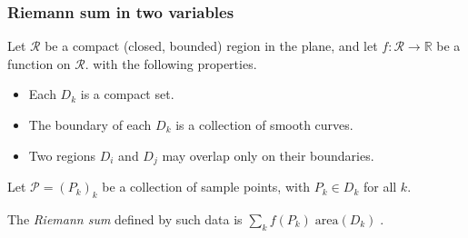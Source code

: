\begin{frame}
\frametitle{Riemann sum in two variables}
Let $\mathcal{R}$ be a compact (closed, bounded) region in the plane, and let $f \colon \mathcal{R} \to \mathbb{R}$ be a function on $\mathcal{R}$.
 with the following properties.
\begin{itemize}
\item Each $D_k$ is a compact set.
\item The boundary of each $D_k$ is a collection of smooth curves.
\item Two regions $D_i$ and $D_j$ may overlap only on their boundaries.
\end{itemize}
Let $\mathcal{P} = (P_k)_k$ be a collection of sample points, with $P_k \in D_k$ for all $k$.

\begin{definition}
The \emph{Riemann sum} defined by such data is
$
\displaystyle\sum\limits_k f(P_k) \; \text{area}(D_k)\; .
$
\end{definition}
\end{frame}